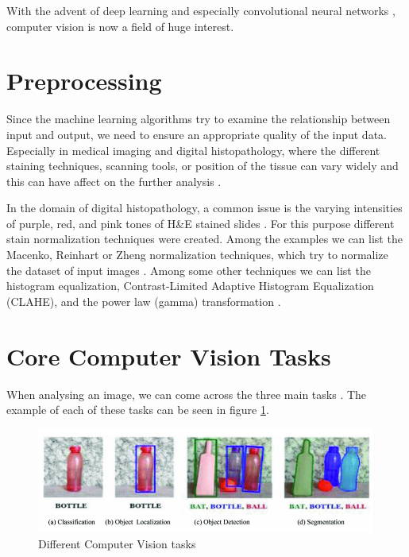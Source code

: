 With the advent of deep learning \cite{LeCun2015} and especially convolutional neural networks \cite{Ronneberger2015}, computer vision is now a field of huge interest.

\section{Preprocessing}
Since the machine learning algorithms try to examine the relationship between input and output, we need to ensure an appropriate quality of the input data. Especially in medical imaging and digital histopathology, where the different staining techniques, scanning tools, or position of the tissue can vary widely and this can have affect on the further analysis \cite{Hoque2024}.

In the domain of digital histopathology, a common issue is the varying intensities of purple, red, and pink tones of H\&E stained slides \cite{Hoque2024}. For this purpose different stain normalization techniques were created. Among the examples we can list the Macenko, Reinhart or Zheng normalization techniques, which try to normalize the dataset of input images \cite{Hoque2024}. Among some other techniques we can list the histogram equalization, Contrast-Limited Adaptive Histogram Equalization (CLAHE), and the power law (gamma) transformation \cite{Dabass2020}.

\section{Core Computer Vision Tasks}
When analysing an image, we can come across the three main tasks \cite{Alam2021}. The example of each of these tasks can be seen in figure \ref{fig:aiml-tasks}.

\begin{figure}[H]
\begin{centering}
\includegraphics[width=12cm]{assets/images/aiml-tasks.png}
\par\end{centering}
\caption{Different Computer Vision tasks \cite{Alam2021}}
\label{fig:aiml-tasks}
\end{figure}

